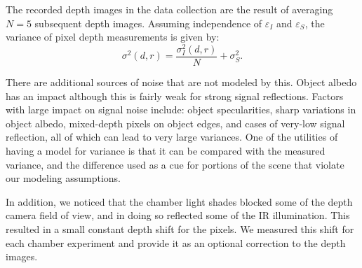 The recorded depth images in the data collection are the result of averaging $N=5$ subsequent depth images.
Assuming independence of $\varepsilon_I$ and $\varepsilon_S$, the variance of pixel depth measurements is given by:
\begin{equation}
\sigma^2(d,r) = \frac{\sigma_I^2(d,r)}{N} + \sigma_S^2.\label{eq:sigma}
\end{equation}

There are additional sources of noise that are not modeled by this.
Object albedo has an impact although this is fairly weak for strong signal reflections.
Factors with large impact on signal noise include: object specularities, sharp variations in object albedo, mixed-depth pixels on object edges, and cases of very-low signal reflection, all of which can lead to very large variances.
One of the utilities of having a model for variance is that it can be compared with the measured variance, and the difference used as a cue for portions of the scene that violate our modeling assumptions.

In addition, we noticed that the chamber light shades blocked some of the depth camera field of view, and in doing so reflected some of the IR illumination.
This resulted in a small constant depth shift for the pixels.
We measured this shift for each chamber experiment and provide it as an optional correction to the depth images.






